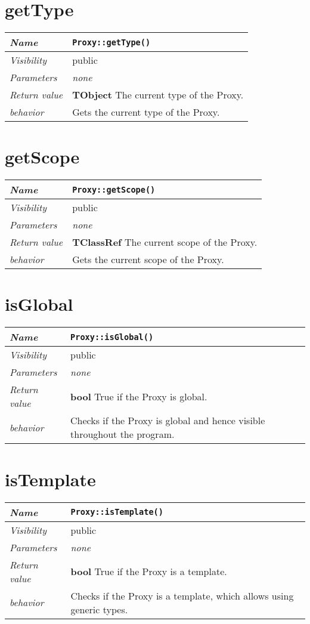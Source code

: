  \section{getType}
\begin{longtable}{p{3cm} @{\hskip 1cm} p{12cm}}
 \hline
\textit{Name} & \texttt{Proxy::getType()}\\
\hline
 \textit{Visibility} & public\\
\hline
\textit{Parameters} & \textit{none}\\
\hline
\textit{Return value} & \textbf{ TObject} The current type of the Proxy. \\
  \hline
 \textit{behavior} & Gets the current type of the Proxy. \\
\hline
\end{longtable} \pagebreak
 \section{getScope}
\begin{longtable}{p{3cm} @{\hskip 1cm} p{12cm}}
 \hline
\textit{Name} & \texttt{Proxy::getScope()}\\
\hline
 \textit{Visibility} & public\\
\hline
\textit{Parameters} & \textit{none}\\
\hline
\textit{Return value} & \textbf{ TClassRef} The current scope of the Proxy. \\
  \hline
 \textit{behavior} & Gets the current scope of the Proxy. \\
\hline
\end{longtable} \pagebreak
 \section{isGlobal}
\begin{longtable}{p{3cm} @{\hskip 1cm} p{12cm}}
 \hline
\textit{Name} & \texttt{Proxy::isGlobal()}\\
\hline
 \textit{Visibility} & public\\
\hline
\textit{Parameters} & \textit{none}\\
\hline
\textit{Return value} & \textbf{ bool} True if the Proxy is global. \\
  \hline
 \textit{behavior} & Checks if the Proxy is global and hence visible throughout the program. \\
\hline
\end{longtable} \pagebreak
 \section{isTemplate}
\begin{longtable}{p{3cm} @{\hskip 1cm} p{12cm}}
 \hline
\textit{Name} & \texttt{Proxy::isTemplate()}\\
\hline
 \textit{Visibility} & public\\
\hline
\textit{Parameters} & \textit{none}\\
\hline
\textit{Return value} & \textbf{ bool} True if the Proxy is a template. \\
  \hline
 \textit{behavior} & Checks if the Proxy is a template, which allows using generic types. \\
\hline
\end{longtable} \pagebreak
